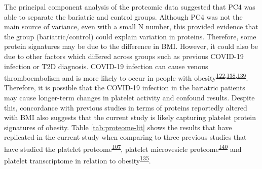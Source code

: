 \documentclass[11pt,twoside]{bristolthesis}
\begin{document}
The principal component analysis of the proteomic data suggested that PC4 was able to separate the bariatric and control groups. Although PC4 was not the main source of variance, even with a small N number, this provided evidence that the group (bariatric/control) could explain variation in proteins. Therefore, some protein signatures may be due to the difference in BMI. However, it could also be due to other factors which differed across groups such as previous COVID-19 infection or T2D diagnosis. COVID-19 infection can cause venous thromboembolism and is more likely to occur in people with obesity\textsuperscript{\protect\hyperlink{ref-Klok2020}{122},\protect\hyperlink{ref-McFadyen2020}{138},\protect\hyperlink{ref-Wang2021}{139}}. Therefore, it is possible that the COVID-19 infection in the bariatric patients may cause longer-term changes in platelet activity and confound results. Despite this, concordance with previous studies in terms of proteins reportedly altered with BMI also suggests that the current study is likely capturing platelet protein signatures of obesity. Table \ref{tab:proteome-lit} shows the results that have replicated in the current study when comparing to three previous studies that have studied the platelet proteome\textsuperscript{\protect\hyperlink{ref-Barrachina2019}{107}}, platelet microvesicle proteome\textsuperscript{\protect\hyperlink{ref-Grande2019}{140}} and platelet transcriptome in relation to obesity\textsuperscript{\protect\hyperlink{ref-Freedman2010}{135}}.
\end{document}
